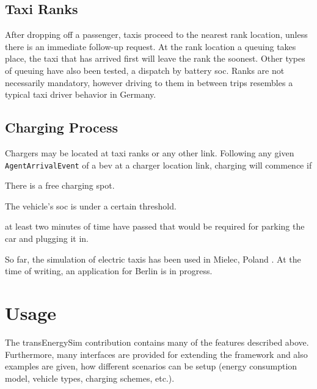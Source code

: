 \subsection{Taxi Ranks}
After dropping off a passenger, taxis proceed to the nearest rank location, unless there is an immediate follow-up request. At the rank location a queuing takes place, \ie the taxi that has arrived first will leave the rank the soonest. Other types of queuing have also been tested, \eg a dispatch by battery \gls{soc}.
Ranks are not necessarily mandatory, however driving to them in between trips resembles a typical taxi driver behavior in Germany.

\subsection{Charging Process}
Chargers may be located at taxi ranks or any other link. Following any given \lstinline$AgentArrivalEvent$ of a \gls{bev} at a charger location link, charging will commence if
%
\begin{compactitem}
	\item There is a free charging spot.
	\item The vehicle's \gls{soc} is under a certain threshold.
	\item at least two minutes of time have passed that would be required for parking the car and plugging it in.
\end{compactitem}

So far, the simulation of electric taxis has been used in Mielec, Poland \citep[][]{Bischoff2013MaTaxis, BischoffMaciejewskiEcabMielecMobilTUM}. At the time of writing, an application for Berlin is in progress.

\section{Usage}
The transEnergySim \gls{contribution} contains many of the features described above. Furthermore, many interfaces are provided for extending the framework and also examples are given, how different scenarios can be setup (\eg energy consumption model, vehicle types, charging schemes, etc.).


